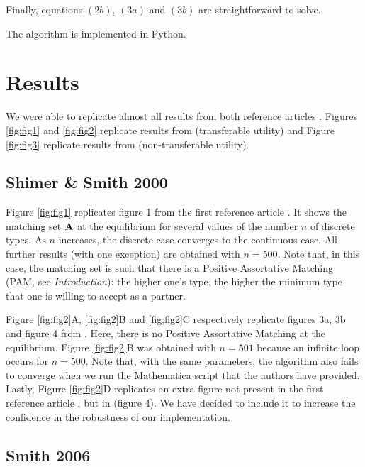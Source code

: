 Finally, equations $(2b)$, $(3a)$ and $(3b)$ are straightforward to solve.

The algorithm is implemented in Python.





\section*{Results}

We were able to replicate almost all results from both reference articles \citep{shimer_assortative_2000,smith_marriage_2006}. Figures \ref{fig:fig1} and \ref{fig:fig2} replicate results from \citep{shimer_assortative_2000} (transferable utility) and Figure \ref{fig:fig3} replicate results from \citep{smith_marriage_2006} (non-transferable utility).

\subsection*{Shimer \& Smith 2000}

Figure \ref{fig:fig1} replicates figure 1 from the first reference article \citep{shimer_assortative_2000}. It shows the matching set $\boldsymbol{\mathbf{A}}$ at the equilibrium for several values of the number $n$ of discrete types. As $n$ increases, the discrete case converges to the continuous case. All further results (with one exception) are obtained with $n=500$. Note that, in this case, the matching set is such that there is a Positive Assortative Matching (PAM, see \textit{Introduction}): the higher one's type, the higher the minimum type that one is willing to accept as a partner.

Figure \ref{fig:fig2}A, \ref{fig:fig2}B and \ref{fig:fig2}C respectively replicate figures 3a, 3b and figure 4 from \citep{shimer_assortative_2000}. Here, there is no Positive Assortative Matching at the equilibrium. Figure \ref{fig:fig2}B was obtained with $n=501$ because an infinite loop occurs for $n=500$. Note that, with the same parameters, the algorithm also fails to converge when we run the Mathematica script that the authors have provided. Lastly, Figure \ref{fig:fig2}D replicates an extra figure not present in the first reference article \citep{shimer_assortative_2000}, but in \citep{smith_frictional_2011} (figure 4). We have decided to include it to increase the confidence in the robustness of our implementation.



\subsection*{Smith 2006}

